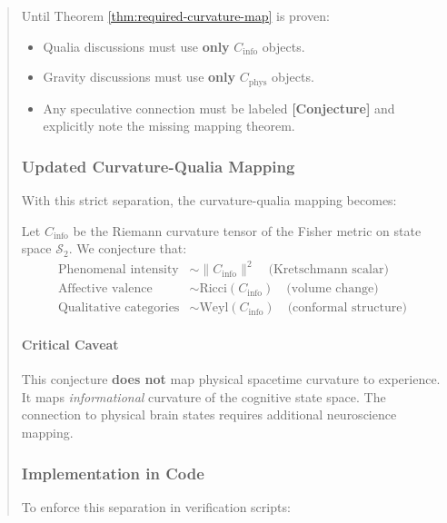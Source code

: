 \documentclass[11pt,titlepage]{article}
\begin{document}
\begin{abstract}
\begin{tcolorbox}[colback=yellow!5!white,colframe=yellow!75!black,title=Interim Protocol]
Until Theorem \ref{thm:required-curvature-map} is proven:
\begin{itemize}
\item Qualia discussions must use \textbf{only} $C_{\mathrm{info}}$ objects.
\item Gravity discussions must use \textbf{only} $C_{\mathrm{phys}}$ objects.
\item Any speculative connection must be labeled \textbf{[Conjecture]} and explicitly note the missing mapping theorem.
\end{itemize}
\end{tcolorbox}

\subsubsection{Updated Curvature-Qualia Mapping}
With this strict separation, the curvature-qualia mapping becomes:

\begin{tcolorbox}[colback=blue!5!white,colframe=blue!75!black,title=Conjecture (Informational Curvature to Qualia)]
\label{conj:info-curvature-qualia}
Let $C_{\mathrm{info}}$ be the Riemann curvature tensor of the Fisher metric on state space $\mathcal{S}_2$. We conjecture that:
\begin{align*}
\text{Phenomenal intensity} &\sim \|C_{\mathrm{info}}\|^2 \quad\text{(Kretschmann scalar)} \\
\text{Affective valence} &\sim \text{Ricci}(C_{\mathrm{info}}) \quad\text{(volume change)} \\
\text{Qualitative categories} &\sim \text{Weyl}(C_{\mathrm{info}}) \quad\text{(conformal structure)}
\end{align*}
\end{tcolorbox}

\paragraph{Critical Caveat}
This conjecture \textbf{does not} map physical spacetime curvature to experience. It maps \emph{informational} curvature of the cognitive state space. The connection to physical brain states requires additional neuroscience mapping.

\subsubsection{Implementation in Code}
To enforce this separation in verification scripts:


\end{abstract}
\end{document}
